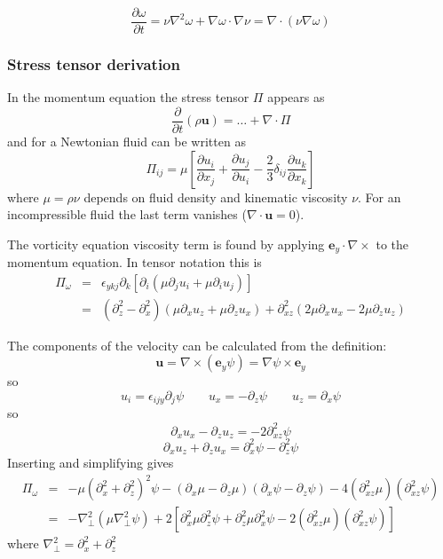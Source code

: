 \documentclass[12pt,a4paper]{article}
\newcommand{\deriv}[2]{\frac{\partial #1}{\partial #2}}
\newcommand{\lr}[1]{\left( #1 \right)}
\newcommand{\slr}[1]{\left[ #1 \right]}
\newcommand{\ey}{\ensuremath{\mathbf{e}_y}}
\begin{document}
\begin{equation}
  \frac{\partial\omega}{\partial t} = \nu\nabla^2\omega + \nabla\omega\cdot\nabla\nu = \nabla\cdot\left(\nu \nabla\omega\right)
  \label{eq:vorticity_visc1}
\end{equation}

\subsubsection{Stress tensor derivation}

In the momentum equation the stress tensor $\Pi$ appears as
\begin{equation}
\frac{\partial}{\partial t}\left(\rho \mathbf{u}\right) = \ldots + \nabla\cdot\Pi 
\end{equation}
and for a Newtonian fluid can be written as
\begin{equation}
  \Pi_{ij} = \mu\slr{\deriv{u_i}{x_j} + \deriv{u_j}{u_i} - \frac{2}{3}\delta_{ij} \deriv{u_k}{x_k}}
\end{equation}
where $\mu = \rho\nu$ depends on fluid density and kinematic viscosity $\nu$.
For an incompressible fluid the last term vanishes ($\nabla\cdot\mathbf{u} = 0$).

The vorticity equation viscosity term is found by applying
$\ey\cdot\nabla\times$ to the momentum equation. In tensor notation
this is
\begin{eqnarray}
  \Pi_\omega &=& \epsilon_{ykj}\partial_k\slr{\partial_i\lr{\mu \partial_j u_i
                                            + \mu \partial_i u_j}} \\
  &=& \lr{\partial_z^2 - \partial_x^2}\lr{\mu\partial_x u_z + \mu \partial_z u_x} + \partial_{xz}^2\lr{2\mu\partial_x u_x - 2\mu \partial_zu_z}
\end{eqnarray}

The components of the velocity can be calculated from the definition:
\begin{equation}
  \mathbf{u} = \nabla\times\lr{\ey \psi} = \nabla\psi \times\ey
\end{equation}
so
\begin{equation}
  u_i = \epsilon_{ijy}\partial_j \psi \qquad u_x = -\partial_z\psi \qquad u_z = \partial_x\psi
\end{equation}
so
\[
\partial_x u_x - \partial_z u_z = -2\partial_{xz}^2\psi
\]
\[
\partial_x u_z + \partial_zu_x = \partial_x^2\psi - \partial_z^2\psi
\]
Inserting and simplifying gives
\begin{eqnarray}
  \Pi_\omega &=& -\mu\lr{\partial_x^2 + \partial_z^2}^2\psi - \lr{\partial_x \mu - \partial_z\mu}\lr{\partial_x \psi - \partial_z \psi} - 4\lr{\partial_{xz}^2\mu}\lr{\partial_{xz}^2\psi} \\
  &=& -\nabla_\perp^2\lr{\mu \nabla_\perp^2\psi} + 2\slr{\partial_x^2\mu \partial_z^2\psi + \partial_z^2\mu \partial_x^2\psi - 2\lr{\partial_{xz}^2\mu}\lr{\partial_{xz}^2\psi}}
\end{eqnarray}
where $\nabla_\perp^2 = \partial_x^2 + \partial_z^2$
\end{document}
